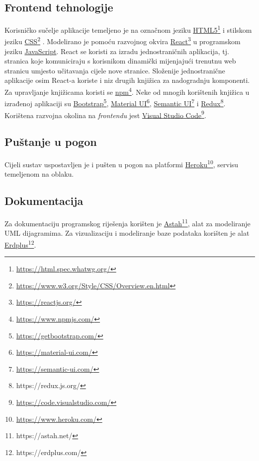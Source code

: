 			\subsection{Frontend tehnologije}
			Korisničko sučelje aplikacije temeljeno je na označnom jeziku \uline{HTML5}\footnote{\url{https://html.spec.whatwg.org/}} i stilskom jeziku \uline{CSS}\footnote{\url{https://www.w3.org/Style/CSS/Overview.en.html}} . Modelirano je pomoću razvojnog okvira \uline{React}\footnote{\url{https://reactjs.org/}} u programskom jeziku \uline{JavaScript}. React se koristi za izradu jednostraničnih aplikacija, tj. stranica koje komuniciraju s korisnikom dinamički mijenjajući trenutnu web stranicu umjesto učitavanja cijele nove stranice. Složenije jednostranične aplikacije osim React-a koriste i niz drugih knjižica za nadogradnju komponenti. Za upravljanje knjižicama koristi se \uline{npm}\footnote{\url{https://www.npmjs.com/}}. Neke od mnogih korištenih knjižica u izrađenoj aplikaciji su \uline{Bootstrap}\footnote{\url{https://getbootstrap.com/}}, \uline{Material UI}\footnote{\url{https://material-ui.com/}}, \uline{Semantic UI}\footnote{\url{https://semantic-ui.com/}} i \uline{Redux}\footnote{https://redux.js.org/}. Korištena razvojna okolina na \textit{frontendu} jest \uline{Visual Studio Code}\footnote{\url{https://code.visualstudio.com/}}.
			
			 \subsection{Puštanje u pogon}
            Cijeli sustav uspostavljen je i pušten u pogon na platformi \uline{Heroku}\footnote{\url{https://www.heroku.com/}}, servisu temeljenom na oblaku.
            
			\subsection{Dokumentacija}
			Za dokumentaciju programskog riješenja korišten je \uline{Astah}\footnote{https://astah.net/}, alat za modeliranje UML dijagramima. Za vizualizaciju i modeliranje baze podataka korišten je alat \uline{Erdplus}\footnote{https://erdplus.com/}.
			
